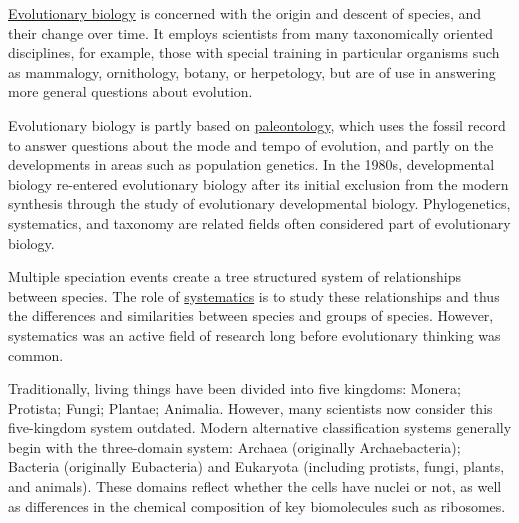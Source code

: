 \href{https://en.wikipedia.org/wiki/Evolutionary_biology}{Evolutionary biology} is concerned with the origin and descent of species, and their change over time. It employs scientists from many taxonomically oriented disciplines, for example, those with special training in particular organisms such as mammalogy, ornithology, botany, or herpetology, but are of use in answering more general questions about evolution.

Evolutionary biology is partly based on \href{https://en.wikipedia.org/wiki/Paleontology}{paleontology}, which uses the fossil record to answer questions about the mode and tempo of evolution, and partly on the developments in areas such as population genetics. In the 1980s, developmental biology re-entered evolutionary biology after its initial exclusion from the modern synthesis through the study of evolutionary developmental biology. Phylogenetics, systematics, and taxonomy are related fields often considered part of evolutionary biology.

Multiple speciation events create a tree structured system of relationships between species. The role of \href{https://en.wikipedia.org/wiki/Systematics}{systematics} is to study these relationships and thus the differences and similarities between species and groups of species. However, systematics was an active field of research long before evolutionary thinking was common.

Traditionally, living things have been divided into five kingdoms: Monera; Protista; Fungi; Plantae; Animalia. However, many scientists now consider this five-kingdom system outdated. Modern alternative classification systems generally begin with the three-domain system: Archaea (originally Archaebacteria); Bacteria (originally Eubacteria) and Eukaryota (including protists, fungi, plants, and animals). These domains reflect whether the cells have nuclei or not, as well as differences in the chemical composition of key biomolecules such as ribosomes.



